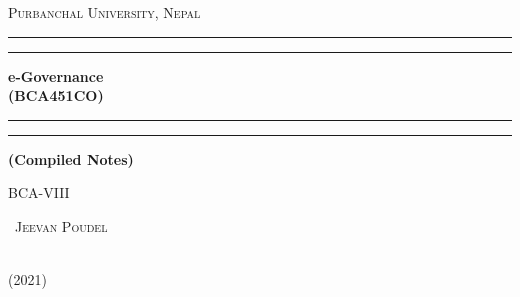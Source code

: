 	\thispagestyle{empty}

\begin{titlepage}
\centering
{\scshape\LARGE Purbanchal University, Nepal \par}
\vspace{0.5cm}
\vspace*{\baselineskip} %

\rule{\textwidth}{1.6pt}\vspace*{-\baselineskip}\vspace*{2pt} %
\rule{\textwidth}{0.4pt} %

\vspace{0.75\baselineskip} %

{\huge\bfseries e-Governance \\(BCA451CO)\\}

\vspace{0.75\baselineskip} %

\rule{\textwidth}{0.4pt}\vspace*{-\baselineskip}\vspace{3.2pt} %
\rule{\textwidth}{1.6pt} %

\vspace{2\baselineskip} %

{\normalsize \bfseries (Compiled Notes)}

\vspace{2cm}

{\Large\scshape BCA-VIII \par}


\vfill

{\Huge\scshape ~{Jeevan Poudel}\par}


\vfill


\vspace{0.3\baselineskip} 
{\Large ~{\vspace*{0.1cm} \\(2021)} \par} 


\end{titlepage}
